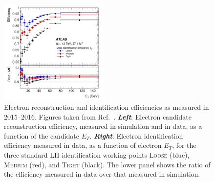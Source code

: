 \begin{figure}[!htb]
    \begin{center}
        \includegraphics[width=0.48\textwidth]{figures/chapter3/egamma/egamma_id_eff_Et}
        \caption{
            Electron reconstruction and identification efficiencies as measured in 2015--2016. Figures taken from Ref.~\cite{Aaboud:2657964}.
            \textbf{\textit{Left}}: Electron candidate reconstruction efficiency, measured in simulation and in data, as
                a function of the candidate $E_T$.
            \textbf{\textit{Right}}: Electron identification efficiency measured in data, as a function of electron $E_T$,
                for the three standard LH identification working points \textsc{Loose} (blue), \textsc{Medium} (red), and \textsc{Tight} (black).
                The lower panel shows the ratio of the efficiency measured in data over that measured in simulation.
        }
        \label{fig:egamma_eff_Et}
    \end{center}
\end{figure}

%
%
